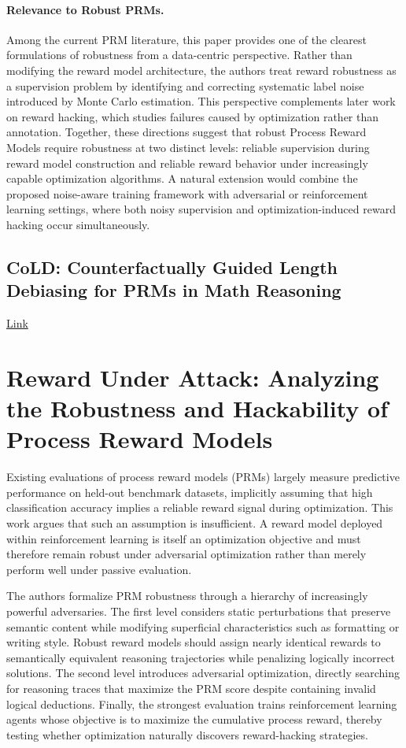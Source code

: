 \documentclass[11pt]{article}
\begin{document}
\paragraph{Relevance to Robust PRMs.}
Among the current PRM literature, this paper provides one of the clearest formulations of robustness from a data-centric perspective. Rather than modifying the reward model architecture, the authors treat reward robustness as a supervision problem by identifying and correcting systematic label noise introduced by Monte Carlo estimation. This perspective complements later work on reward hacking, which studies failures caused by optimization rather than annotation. Together, these directions suggest that robust Process Reward Models require robustness at two distinct levels: reliable supervision during reward model construction and reliable reward behavior under increasingly capable optimization algorithms. A natural extension would combine the proposed noise-aware training framework with adversarial or reinforcement learning settings, where both noisy supervision and optimization-induced reward hacking occur simultaneously.

\subsection{CoLD: Counterfactually Guided Length Debiasing for PRMs in Math Reasoning} 

\href{https://arxiv.org/abs/2507.15698}{Link}
\section{Reward Under Attack: Analyzing the Robustness and Hackability of Process Reward Models}

Existing evaluations of process reward models (PRMs) largely measure predictive performance on held-out benchmark datasets, implicitly assuming that high classification accuracy implies a reliable reward signal during optimization. This work argues that such an assumption is insufficient. A reward model deployed within reinforcement learning is itself an optimization objective and must therefore remain robust under adversarial optimization rather than merely perform well under passive evaluation.

The authors formalize PRM robustness through a hierarchy of increasingly powerful adversaries. The first level considers static perturbations that preserve semantic content while modifying superficial characteristics such as formatting or writing style. Robust reward models should assign nearly identical rewards to semantically equivalent reasoning trajectories while penalizing logically incorrect solutions. The second level introduces adversarial optimization, directly searching for reasoning traces that maximize the PRM score despite containing invalid logical deductions. Finally, the strongest evaluation trains reinforcement learning agents whose objective is to maximize the cumulative process reward, thereby testing whether optimization naturally discovers reward-hacking strategies.
\end{document}

